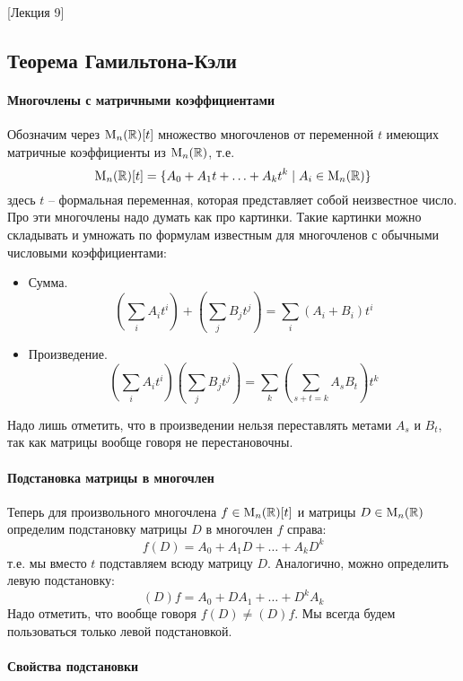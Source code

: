 [Лекция 9]


\subsection{Теорема Гамильтона-Кэли}

\paragraph{Многочлены с матричными коэффициентами}

Обозначим через $\operatorname{M}_{n}(\mathbb R)[t]$ множество многочленов от переменной $t$ имеющих матричные коэффициенты из $\operatorname{M}_{n}(\mathbb R)$, т.е.
\[
\operatorname{M}_{n}(\mathbb R)[t] = \{A_0+A_1t+\ldots + A_k t^k\mid A_i\in \operatorname{M}_{n}(\mathbb R)\}
\]
здесь $t$ -- формальная переменная, которая представляет собой неизвестное число.
Про эти многочлены надо думать как про картинки.
Такие картинки можно складывать и умножать по формулам известным для многочленов с обычными числовыми коэффициентами:
\begin{itemize}
\item Сумма.
\[
\left(\sum_{i}A_i t^i\right) +\left (\sum_{j}B_j t^j\right) = \sum_{i}(A_i+ B_i) t^i
\]

\item Произведение.
\[
\left(\sum_i A_i t^i\right)\left( \sum_j B_j t^j\right) = \sum_k \left(\sum_{s+t = k}A_s B_t\right)t^k
\]
\end{itemize}
Надо лишь отметить, что в произведении нельзя переставлять метами $A_s$ и $B_t$, так как матрицы вообще говоря не перестановочны.

\paragraph{Подстановка матрицы в многочлен} 

Теперь для произвольного многочлена $f\in\operatorname{M}_{n}(\mathbb R)[t]$ и матрицы $D\in\operatorname{M}_{n}(\mathbb R)$ определим подстановку матрицы $D$ в многочлен $f$ справа:
\[
f(D) = A_0 + A_1 D + \ldots + A_k D^k
\]
т.е. мы вместо $t$ подставляем всюду матрицу $D$.
Аналогично, можно определить левую подстановку:
\[
(D)f = A_0 + D A_1 + \ldots + D^k A_k
\]
Надо отметить, что вообще говоря $f(D)\neq (D)f$.
Мы всегда будем пользоваться только левой подстановкой.

\paragraph{Свойства подстановки}

